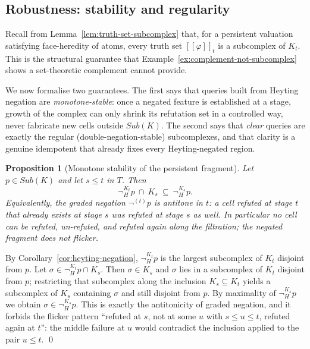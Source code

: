 \documentclass[final,12pt]{elsarticle}
\newcommand{\llbracket}{[\![}
\newcommand{\rrbracket}{]\!]}
\theoremstyle{plain}
\newtheorem{prop}[thm]{Proposition}
\theoremstyle{definition}
\begin{document}
\subsection{Robustness: stability and regularity}

Recall from Lemma~\ref{lem:truth-set-subcomplex} that, for a persistent
valuation satisfying face-heredity of atoms, every truth set
$\llbracket\varphi\rrbracket_t$ is a subcomplex of $K_t$. This is the
structural guarantee that Example~\ref{ex:complement-not-subcomplex}
shows a set-theoretic complement cannot provide.

We now formalise two guarantees. The first says that queries built from
Heyting negation are \emph{monotone-stable}: once a negated feature is
established at a stage, growth of the complex can only shrink its
refutation set in a controlled way, never fabricate new cells outside
$Sub(K)$. The second says that \emph{clear} queries are exactly the
regular (double-negation-stable) subcomplexes, and that clarity is a
genuine idempotent that already fixes every Heyting-negated region.

\begin{prop}[Monotone stability of the persistent fragment]
\label{prop:persistent-stability}
Let $p\in Sub(K)$ and let $s\le t$ in $T$. Then
\[
\neg_H^{K_t}p\ \cap\ K_s\ \subseteq\ \neg_H^{K_s}p .
\]
Equivalently, the graded negation $\neg^{(t)}p$ is antitone in $t$: a
cell refuted at stage $t$ that already exists at stage $s$ was refuted
at stage $s$ as well. In particular no cell can be refuted, un-refuted,
and refuted again along the filtration; the negated fragment does not
flicker.
\end{prop}

\proof
By Corollary~\ref{cor:heyting-negation}, $\neg_H^{K_t}p$ is the largest
subcomplex of $K_t$ disjoint from $p$. Let
$\sigma\in\neg_H^{K_t}p\cap K_s$. Then $\sigma\in K_s$ and $\sigma$ lies
in a subcomplex of $K_t$ disjoint from $p$; restricting that subcomplex
along the inclusion $K_s\subseteq K_t$ yields a subcomplex of $K_s$
containing $\sigma$ and still disjoint from $p$. By maximality of
$\neg_H^{K_s}p$ we obtain $\sigma\in\neg_H^{K_s}p$. This is exactly the
antitonicity of graded negation, and it forbids the flicker pattern
``refuted at $s$, not at some $u$ with $s\le u\le t$, refuted again at
$t$'': the middle failure at $u$ would contradict the inclusion applied
to the pair $u\le t$.
\qed
\end{document}
